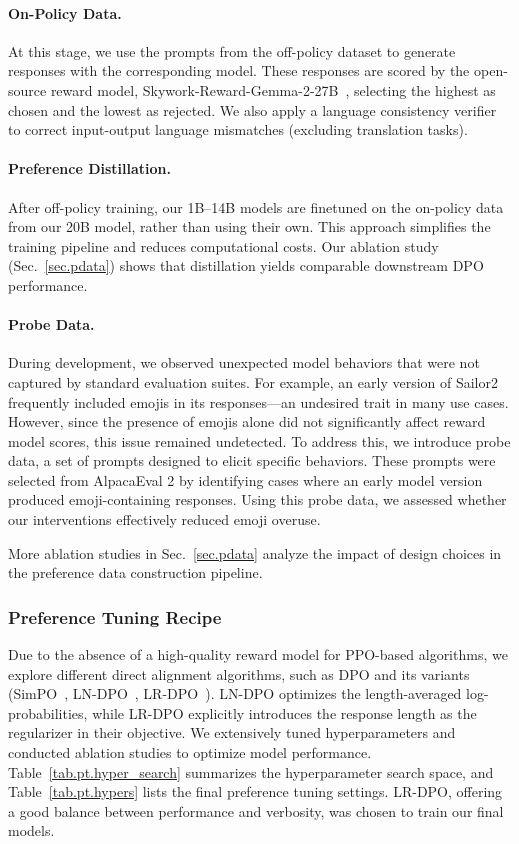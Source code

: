 \paragraph{On-Policy Data.} 
At this stage, we use the prompts from the off-policy dataset to generate responses with the corresponding model. These responses are scored by the open-source reward model, Skywork-Reward-Gemma-2-27B~\citep{liu2024skywork}, selecting the highest as chosen and the lowest as rejected. 
We also apply a language consistency verifier to correct input-output language mismatches (excluding translation tasks).

\paragraph{Preference Distillation.}  
After off-policy training, our 1B–14B models are finetuned on the on-policy data from our 20B model, rather than using their own. This approach simplifies the training pipeline and reduces computational costs. Our ablation study (Sec.~\ref{sec.pdata}) shows that distillation yields comparable downstream DPO performance.

\paragraph{Probe Data.} 
During development, we observed unexpected model behaviors that were not captured by standard evaluation suites. For example, an early version of Sailor2 frequently included emojis in its responses—an undesired trait in many use cases. However, since the presence of emojis alone did not significantly affect reward model scores, this issue remained undetected. To address this, we introduce probe data, a set of prompts designed to elicit specific behaviors. These prompts were selected from AlpacaEval 2 by identifying cases where an early model version produced emoji-containing responses. Using this probe data, we assessed whether our interventions effectively reduced emoji overuse. 

More ablation studies in Sec.~\ref{sec.pdata} analyze the impact of design choices in the preference data construction pipeline.

\subsubsection{Preference Tuning Recipe}\label{sec.pt.recipe}

Due to the absence of a high-quality reward model for PPO-based algorithms, we explore different direct alignment algorithms, such as DPO and its variants (SimPO~\citep{meng2024simpo}, LN-DPO~\citep{rafailov2024direct}, LR-DPO~\citep{park2024disentangling}). 
LN-DPO optimizes the length-averaged log-probabilities, while LR-DPO explicitly introduces the response length as the regularizer in their objective. 
We extensively tuned hyperparameters and conducted ablation studies to optimize model performance. Table~\ref{tab.pt.hyper_search} summarizes the hyperparameter search space, and Table~\ref{tab.pt.hypers} lists the final preference tuning settings. LR-DPO, offering a good balance between performance and verbosity, was chosen to train our final models.

